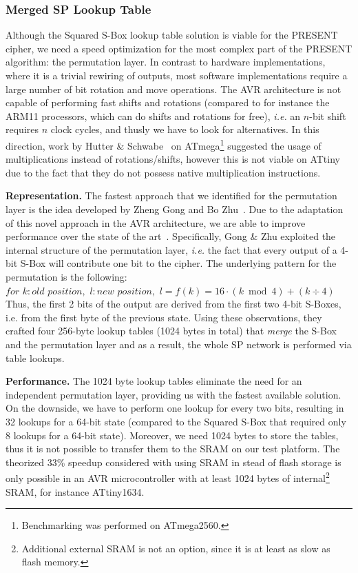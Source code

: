 \documentclass[11pt]{llncs2e} %
\begin{document}
\subsubsection{Merged SP Lookup Table}\label{msbox}
Although the Squared S-Box lookup table solution is viable for the PRESENT cipher, we need a speed optimization for the most complex part of the PRESENT algorithm: the permutation layer.
In contrast to hardware implementations, where it is a trivial rewiring of outputs, most software implementations require a large number of bit rotation and move operations.
The AVR architecture is not capable of performing fast shifts and rotations (compared to for instance the ARM11 processors, which can do shifts and rotations for free), \emph{i.e.} an $n$-bit shift requires $n$ clock cycles, and thusly we have to look for alternatives.
In this direction, work by Hutter \& Schwabe~\cite{hutternacl} on ATmega\footnote{Benchmarking was performed on ATmega2560.} suggested the usage of multiplications instead of rotations/shifts, however this is not viable on ATtiny due to the fact that they do not possess native multiplication instructions.

\textbf{Representation.} The fastest approach that we identified for the permutation layer is the idea developed by Zheng Gong and Bo Zhu~\cite{gong_code,gong2009towards}.
Due to the adaptation of this novel approach in the AVR architecture, we are able to improve performance over the state of the art~\cite{eisenbarth2012compact}.
Specifically, Gong \& Zhu exploited the internal structure of the permutation layer, \emph{i.e.} the fact that every output of a 4-bit S-Box will contribute one bit to the cipher.
The underlying pattern for the permutation is the following:\\

$for$ $k:old$ $position,$ $l:new$ $position,$ $l=f(k)=16 \cdot (k \bmod 4)+(k \div 4)$ \\

Thus, the first 2 bits of the output are derived from the first two 4-bit S-Boxes, i.e. from the first byte of the previous state.
Using these observations, they crafted four 256-byte lookup tables (1024 bytes in total) that \emph{merge} the S-Box and the permutation layer and as a result, the whole SP network is performed via table lookups.

\textbf{Performance.}
The 1024 byte lookup tables eliminate the need for an independent permutation layer, providing us with the fastest available solution.
On the downside, we have to perform one lookup for every two bits, resulting in 32 lookups for a 64-bit state (compared to the Squared S-Box that required only 8 lookups for a 64-bit state).
Moreover, we need 1024 bytes to store the tables, thus it is not possible to transfer them to the SRAM on our test platform.
The theorized 33\% speedup considered with using SRAM in stead of flash storage is only possible in an AVR microcontroller with at least 1024 bytes of internal\footnote{Additional external SRAM is not an option, since it is at least as slow as flash memory.} SRAM, for instance ATtiny1634.
\end{document}
